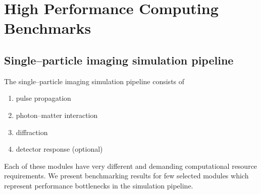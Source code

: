 \documentclass[10pt]{scrartcl}
\begin{document}
\section{High Performance Computing Benchmarks}
\subsection{Single--particle imaging simulation pipeline}
The single--particle imaging simulation pipeline consists of
%
\begin{enumerate}
  \item pulse propagation
  \item photon--matter interaction
  \item diffraction
  \item detector response (optional)
\end{enumerate}
%
Each of these modules have very different and demanding computational resource
requirements. We present benchmarking results for few selected modules which
represent performance bottlenecks in the simulation pipeline.
%
\end{document}

